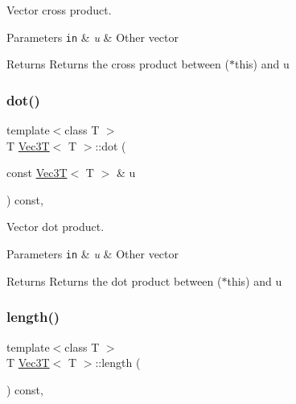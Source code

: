 Vector cross product. 


\begin{DoxyParams}[1]{Parameters}
\mbox{\tt in}  & {\em u} & Other vector \\
\hline
\end{DoxyParams}
\begin{DoxyReturn}{Returns}
Returns the cross product between ($\ast$this) and u 
\end{DoxyReturn}
\mbox{\label{classVec3T_ab4bebdfbdc863826a1a7e86cad130ff8}} 
\subsubsection{\texorpdfstring{dot()}{dot()}}
{\footnotesize\ttfamily template$<$class T $>$ \\
T \hyperlink{classVec3T}{Vec3T}$<$ T $>$\+::dot (\begin{DoxyParamCaption}\item[{const \hyperlink{classVec3T}{Vec3T}$<$ T $>$ \&}]{u }\end{DoxyParamCaption}) const\hspace{0.3cm}{\ttfamily [inline]}, {\ttfamily [noexcept]}}



Vector dot product. 


\begin{DoxyParams}[1]{Parameters}
\mbox{\tt in}  & {\em u} & Other vector \\
\hline
\end{DoxyParams}
\begin{DoxyReturn}{Returns}
Returns the dot product between ($\ast$this) and u 
\end{DoxyReturn}
\mbox{\label{classVec3T_a93c868b181e24a4f74702a8b8a36f815}} 
\subsubsection{\texorpdfstring{length()}{length()}}
{\footnotesize\ttfamily template$<$class T $>$ \\
T \hyperlink{classVec3T}{Vec3T}$<$ T $>$\+::length (\begin{DoxyParamCaption}{ }\end{DoxyParamCaption}) const\hspace{0.3cm}{\ttfamily [inline]}, {\ttfamily [noexcept]}}



